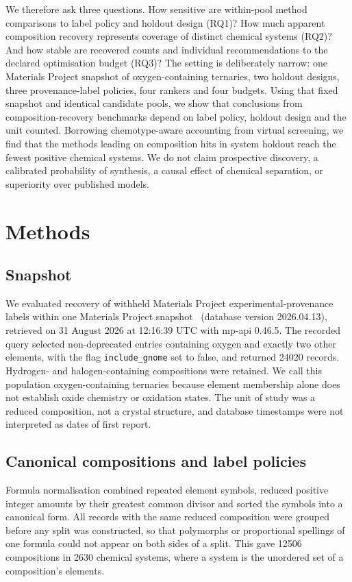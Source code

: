 \documentclass[11pt,a4paper]{article}
\begin{document}
We therefore ask three questions. How sensitive are within-pool method comparisons to label policy and holdout design (RQ1)? How much apparent composition recovery represents coverage of distinct chemical systems (RQ2)? And how stable are recovered counts and individual recommendations to the declared optimisation budget (RQ3)? The setting is deliberately narrow: one Materials Project snapshot of oxygen-containing ternaries, two holdout designs, three provenance-label policies, four rankers and four budgets. Using that fixed snapshot and identical candidate pools, we show that conclusions from composition-recovery benchmarks depend on label policy, holdout design and the unit counted. Borrowing chemotype-aware accounting from virtual screening, we find that the methods leading on composition hits in system holdout reach the fewest positive chemical systems. We do not claim prospective discovery, a calibrated probability of synthesis, a causal effect of chemical separation, or superiority over published models.

\section{Methods}

\subsection{Snapshot}
We evaluated recovery of withheld Materials Project experimental-provenance labels within one Materials Project snapshot~\citep{jain2013} (database version 2026.04.13), retrieved on 31 August 2026 at 12:16:39 UTC with mp-api 0.46.5. The recorded query selected non-deprecated entries containing oxygen and exactly two other elements, with the flag \texttt{include\_gnome} set to false, and returned \num{24020} records. Hydrogen- and halogen-containing compositions were retained. We call this population oxygen-containing ternaries because element membership alone does not establish oxide chemistry or oxidation states. The unit of study was a reduced composition, not a crystal structure, and database timestamps were not interpreted as dates of first report.

\subsection{Canonical compositions and label policies}
Formula normalisation combined repeated element symbols, reduced positive integer amounts by their greatest common divisor and sorted the symbols into a canonical form. All records with the same reduced composition were grouped before any split was constructed, so that polymorphs or proportional spellings of one formula could not appear on both sides of a split. This gave \num{12506} compositions in \num{2630} chemical systems, where a system is the unordered set of a composition's elements.
\end{document}
